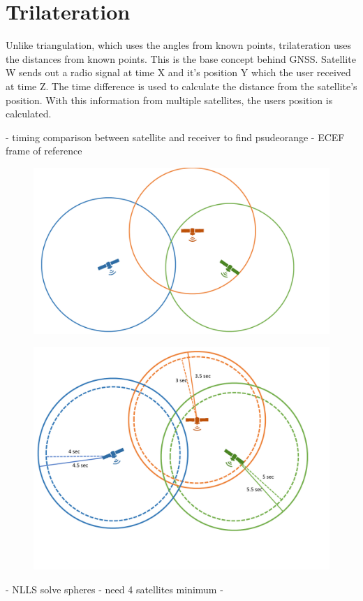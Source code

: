
\section{Trilateration}
Unlike triangulation, which uses the angles from known points, trilateration uses the distances from known points. This is the base concept behind GNSS. Satellite W sends out a radio signal at time X and it's position Y which the user received at time Z. The time difference is used to calculate the distance from the satellite's position. With this information from multiple satellites, the users position is calculated.



- timing comparison between satellite and receiver to find psudeorange
- ECEF frame of reference

\begin{figure}
\centering
\caption{}
\label{fig:trilateration}
\includegraphics[width=0.7\linewidth]{ChapterLiteratureReview/trilateration}
\end{figure}

\begin{figure}
\centering
\caption{}
\label{fig:trilaterationtime}
\includegraphics[width=0.7\linewidth]{ChapterLiteratureReview/trilaterationtime}
\end{figure}







- NLLS solve spheres
- need 4 satellites minimum
- 
